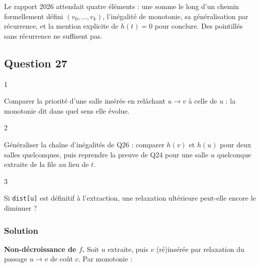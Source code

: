 \documentclass[11pt,a4paper]{article}
\newcommand{\equationajustee}[1]{%
  \sbox{\boiteequation}{$\displaystyle #1$}%
  \ifdim\wd\boiteequation>\linewidth
    \[\resizebox{\linewidth}{!}{\usebox{\boiteequation}}\]%
  \else
    \[#1\]%
  \fi}
\begin{document}
\begin{jury}

Le rapport 2026 attendait quatre éléments : une somme le long d'un chemin formellement défini \((v_0, \dots, v_k)\), l'inégalité de monotonie, sa généralisation par récurrence, et la mention explicite de \(h(t) = 0\) pour conclure. Des pointillés sans récurrence ne suffisent pas.

\end{jury}

\hypertarget{question-27}{%
\subsection{Question 27}\label{question-27}}

\begin{indication}{1}

Comparer la priorité d'une salle insérée en relâchant \(u \to v\) à celle de \(u\) : la monotonie dit dans quel sens elle évolue.

\end{indication}

\begin{indication}{2}

Généraliser la chaîne d'inégalités de Q26 : comparer \(h(v)\) et \(h(u)\) pour deux salles quelconques, puis reprendre la preuve de Q24 pour une salle \(u\) quelconque extraite de la file au lieu de \(t\).

\end{indication}

\begin{indication}{3}

Si \texttt{dist{[}u{]}} est définitif à l'extraction, une relaxation ultérieure peut-elle encore le diminuer ?

\end{indication}

\hypertarget{solution-26}{%
\subsubsection{Solution}\label{solution-26}}

\textbf{Non-décroissance de \(f\).} Soit \(u\) extraite, puis \(v\) (ré)insérée par relaxation du passage \(u \to v\) de coût \(c\). Par monotonie :

\equationajustee{\begin{aligned}
f(v) &= \texttt{dist}[u] + c + h(v) \\
&\ge \texttt{dist}[u] + h(u) \\
&= f(u).
\end{aligned}}
\end{document}
